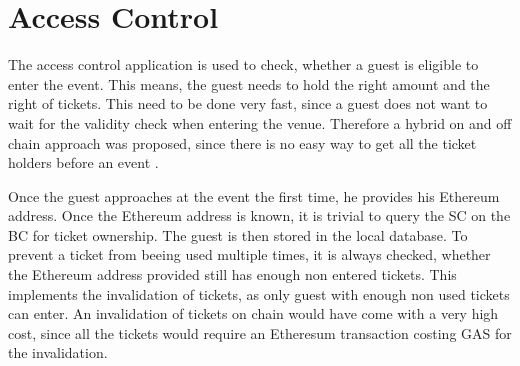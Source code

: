 \section{Access Control}
The access control application is used to check, whether a guest is eligible to enter the event. This means, the guest needs to hold the right amount and the right of tickets. This need to be done very fast, since a guest does not want to wait for the validity check when entering the venue. Therefore a hybrid on and off chain approach was proposed, since there is no easy way to get all the ticket holders before an event .

Once the guest approaches at the event the first time, he provides his Ethereum address. Once the Ethereum address is known, it is trivial to query the SC on the BC for ticket ownership. The guest is then stored in the local database. To prevent a ticket from beeing used multiple times, it is always checked, whether the Ethereum address provided still has enough non entered tickets. This implements the invalidation of tickets, as only guest with enough non used tickets can enter. An invalidation of tickets on chain would have come with a very high cost, since all the tickets would require an Etheresum transaction costing GAS for the invalidation.